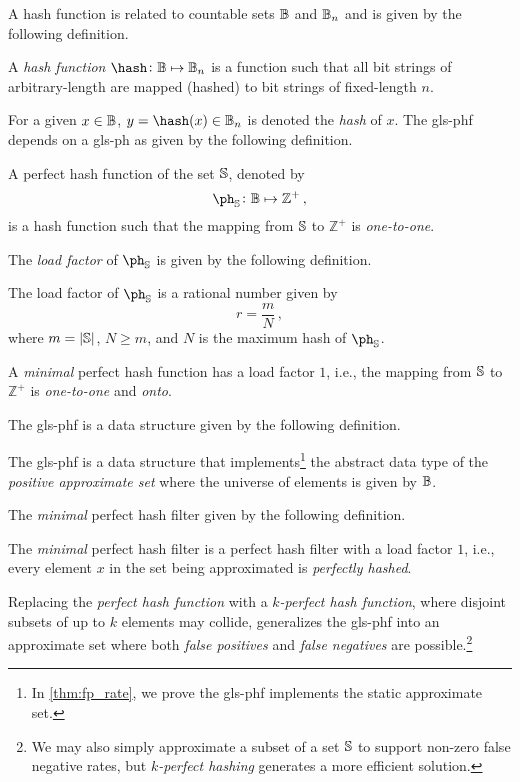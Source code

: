 \documentclass[ ../main.tex]{subfiles}
\begin{document}
A hash function is related to countable sets $\mathbb{B}$ and $\mathbb{B}_n$ and is given by the following definition.
\begin{definition}
A \emph{hash function} $\hash \colon \cisb \mapsto \cisb_n$ is a function such that all bit strings of arbitrary-length are mapped (hashed) to bit strings of fixed-length $n$.
\end{definition}
For a given $x \in \mathbb{B}$, $y = \hash(x) \in \cisb_n$ is denoted the \emph{hash} of $x$. The \gls{gls-phf} depends on a \gls{gls-ph} as given by the following definition.
\begin{definition}
A perfect hash function of the set $\mathbb{S}$, denoted by
\begin{equation}
    \ph_{\St} \colon \cisb \mapsto \mathbb{Z}^{+}\,,
\end{equation}
is a hash function such that the mapping from $\mathbb{S}$ to $\mathbb{Z}^+$ is \emph{one-to-one}.
\end{definition}
The \emph{load factor} of $\ph_{\St}$ is given by the following definition.
\begin{definition}
\label{def:loadfactor}
The load factor of $\ph_{\St}$ is a rational number given by
\begin{equation}
\label{eq:loadfactor}
    r = \frac{m}{N}\,,
\end{equation}
where $m = \left\vert{\mathbb{S}}\right\vert$, $N \geq m$, and $N$ is the maximum hash of $\ph_{\St}$.
\end{definition}
\begin{definition}
A \emph{minimal} perfect hash function has a load factor $1$, i.e., the mapping from $\mathbb{S}$ to $\mathbb{Z}^+$ is \emph{one-to-one} and \emph{onto}.
\end{definition}

The \gls{gls-phf} is a data structure given by the following definition.
\begin{definition}
The \gls{gls-phf} is a data structure that implements\footnote{In \cref{thm:fp_rate}, we prove the \gls{gls-phf} implements the static approximate set.} the abstract data type of the \emph{positive approximate set} where the universe of elements is given by $\mathbb{B}$.
\end{definition}
The \emph{minimal} perfect hash filter given by the following definition.
\begin{definition}
The \emph{minimal} perfect hash filter is a perfect hash filter with a load factor $1$, i.e., every element $x$ in the set being approximated is \emph{perfectly hashed}.
\end{definition}
Replacing the \emph{perfect hash function} with a \emph{$k$-perfect hash function}, where disjoint subsets of up to $k$ elements may collide, generalizes the \gls{gls-phf} into an approximate set where both \emph{false positives} and \emph{false negatives} are possible.\footnote{We may also simply approximate a subset of a set $\mathbb{S}$ to support non-zero false negative rates, but \emph{$k$-perfect hashing} generates a more efficient solution.}
\end{document}

